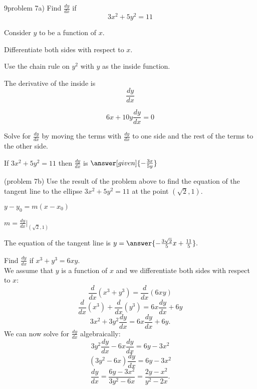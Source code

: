 \documentclass{ximera}
\begin{document}
\begin{center}
\begin{foldable}
\end{foldable}
\end{center}


\begin{problem}9problem 7a)
  Find $\frac{dy}{dx}$ if
  \[
  3x^2 + 5y^2 = 11
  \]
  
	  
    \begin{hint}
      Consider $y$ to be a function of $x$.
    \end{hint}
		\begin{hint}
		  Differentiate both sides with respect to $x$.
		\end{hint}
    \begin{hint}
      Use the chain rule on $y^2$ with $y$ as the inside function.
    \end{hint}
    \begin{hint}
      The derivative of the inside is 
      \[
      \frac{dy}{dx}
      \]
    \end{hint}
		\begin{hint}
		  \[
			6x + 10y\frac{dy}{dx} = 0
			\]
		\end{hint}
		\begin{hint}
		  Solve for $\frac{dy}{dx}$ by moving the terms with $\frac{dy}{dx}$ to one side and the 
			rest of the terms to the other side.
		\end{hint}
    
		If $3x^2 + 5y^2 = 11$ then $\frac{dy}{dx}$ is
		 $\answer[given]{-\frac{3x}{5y}}$
		
\end{problem}


\begin{problem}(problem 7b)
Use the result of the problem above to find the equation of the tangent line to the ellipse $3x^2 + 5y^2 = 11$ at the point $(\sqrt 2,1).$

\begin{hint}
$y-y_0 = m(x-x_0)$
\end{hint}
\begin{hint}
$m = \frac{dy}{dx}\bigg|_{(\sqrt 2, 1)}$
\end{hint}
The equation of the tangent line is $y = \answer{-\frac{3\sqrt 2}{5} x + \frac{11}{5}}.$
\end{problem}



\begin{example}[example 8]
Find  $\frac{dy}{dx}$ if $x^3 + y^3 =6xy$.\\
We assume that $y$ is a function of $x$ and we differentiate both 
sides with respect to $x$:
\[\frac{d}{dx}(x^3 + y^3)  = \frac{d}{dx} (6xy)\]
\[\frac{d}{dx}(x^3) + \frac{d}{dx}(y^3)  = 6x\frac{dy}{dx} + 6y\]
\[3x^2 + 3y^2\frac{dy}{dx}  = 6x\frac{dy}{dx} + 6y.\]
We can now solve for $\displaystyle{\frac{dy}{dx}}$ algebraically:
\[3y^2\frac{dy}{dx}  - 6x\frac{dy}{dx} = 6y-3x^2\]
\[(3y^2- 6x)\frac{dy}{dx}   = 6y-3x^2\]
\[\frac{dy}{dx}   = \frac{6y-3x^2}{3y^2- 6x} = \frac{2y-x^2}{y^2- 2x}.\]
\end{example}
\end{document}
